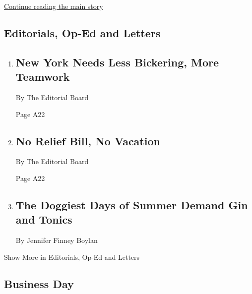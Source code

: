 \protect\hyperlink{after-mid3}{Continue reading the main story}

\hypertarget{editorials-op-ed-and-letters}{%
\subsection{Editorials, Op-Ed and
Letters}\label{editorials-op-ed-and-letters}}

\begin{enumerate}
\def\labelenumi{\arabic{enumi}.}
\item
  \href{/2020/08/04/opinion/cuomo-de-blasio-coronavirus-nyc.html}{}

  \hypertarget{new-york-needs-less-bickering-more-teamwork}{%
  \subsection{New York Needs Less Bickering, More
  Teamwork}\label{new-york-needs-less-bickering-more-teamwork}}

  By The Editorial Board

  Page A22
\item
  \href{/2020/08/04/opinion/coronavirus-relief-bill-senate-recess.html}{}

  \hypertarget{no-relief-bill-no-vacation}{%
  \subsection{No Relief Bill, No
  Vacation}\label{no-relief-bill-no-vacation}}

  By The Editorial Board

  Page A22
\item
  \href{/2020/08/04/opinion/gin-tonic-summer-drink.html}{}

  \hypertarget{the-doggiest-days-of-summer-demand-gin-and-tonics}{%
  \subsection{The Doggiest Days of Summer Demand Gin and
  Tonics}\label{the-doggiest-days-of-summer-demand-gin-and-tonics}}

  By Jennifer Finney Boylan
\end{enumerate}

Show More in Editorials, Op-Ed and Letters

\hypertarget{business-day}{%
\subsection{Business Day}\label{business-day}}

